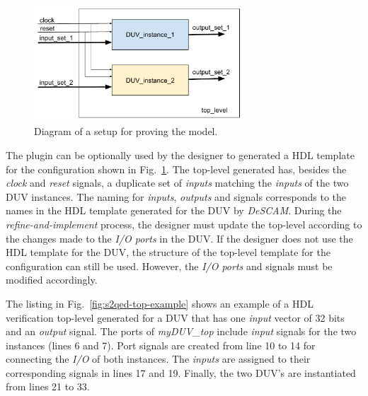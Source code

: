 \begin{figure}[htb!]
	\centering
	\includegraphics[width=0.7\textwidth]{images/top_s2qed.pdf}
	\caption{Diagram of a setup for proving the \SSQED{} model.}
	\label{fig:s2qed-top-diagram}
\end{figure}

The plugin can be optionally used by the designer to generated a HDL template for the configuration shown in Fig.~\ref{fig:s2qed-top-diagram}. The top-level generated has, besides the \textit{clock} and \textit{reset} signals, a duplicate set of \textit{inputs} matching the \textit{inputs} of the two DUV instances. The naming for \textit{inputs}, \textit{outputs} and signals corresponds to the names in the HDL template generated for the DUV by \textit{DeSCAM}. During the \textit{refine-and-implement} process, the designer must update the top-level according to the changes made to the \textit{I/O ports} in the DUV. If the designer does not use the HDL template for the DUV, the structure of the top-level template for the \SSQED{} configuration can still be used. However, the \textit{I/O ports} and signals must be modified accordingly.

The listing in Fig.~\ref{fig:s2qed-top-example} shows an example of a HDL verification top-level generated for a DUV that has one \textit{input} vector of 32 bits and an \textit{output} signal. The ports of \textit{myDUV\_top} include \textit{input} signals for the two instances (lines 6 and 7). Port signals are created from line 10 to 14 for connecting the \textit{I/O} of both instances. The \textit{inputs} are assigned to their corresponding signals in lines 17 and 19.  Finally, the two DUV’s are instantiated from lines 21 to 33.

